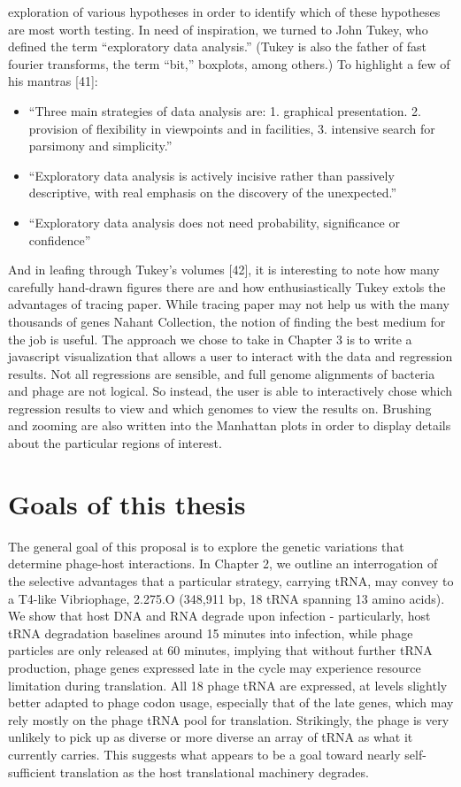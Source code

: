 \documentclass[12pt,twoside]{mitthesis-manusdown}
\begin{document}
exploration of various hypotheses in order to identify which of these
hypotheses are most worth testing. In need of inspiration, we turned to
John Tukey, who defined the term ``exploratory data analysis.'' (Tukey
is also the father of fast fourier transforms, the term ``bit,''
boxplots, among others.) To highlight a few of his mantras {[}41{]}:
\begin{itemize}
\item
  ``Three main strategies of data analysis are: 1. graphical
  presentation. 2. provision of flexibility in viewpoints and in
  facilities, 3. intensive search for parsimony and simplicity.''
\item
  ``Exploratory data analysis is actively incisive rather than passively
  descriptive, with real emphasis on the discovery of the unexpected.''
\item
  ``Exploratory data analysis does not need probability, significance or
  confidence''
\end{itemize}
And in leafing through Tukey's volumes {[}42{]}, it is interesting to
note how many carefully hand-drawn figures there are and how
enthusiastically Tukey extols the advantages of tracing paper. While
tracing paper may not help us with the many thousands of genes Nahant
Collection, the notion of finding the best medium for the job is useful.
The approach we chose to take in Chapter 3 is to write a javascript
visualization that allows a user to interact with the data and
regression results. Not all regressions are sensible, and full genome
alignments of bacteria and phage are not logical. So instead, the user
is able to interactively chose which regression results to view and
which genomes to view the results on. Brushing and zooming are also
written into the Manhattan plots in order to display details about the
particular regions of interest.

\section{Goals of this thesis}\label{goals-of-this-thesis}

The general goal of this proposal is to explore the genetic variations
that determine phage-host interactions. In Chapter 2, we outline an
interrogation of the selective advantages that a particular strategy,
carrying tRNA, may convey to a T4-like Vibriophage, 2.275.O (348,911 bp,
18 tRNA spanning 13 amino acids). We show that host DNA and RNA degrade
upon infection - particularly, host tRNA degradation baselines around 15
minutes into infection, while phage particles are only released at 60
minutes, implying that without further tRNA production, phage genes
expressed late in the cycle may experience resource limitation during
translation. All 18 phage tRNA are expressed, at levels slightly better
adapted to phage codon usage, especially that of the late genes, which
may rely mostly on the phage tRNA pool for translation. Strikingly, the
phage is very unlikely to pick up as diverse or more diverse an array of
tRNA as what it currently carries. This suggests what appears to be a
goal toward nearly self-sufficient translation as the host translational
machinery degrades.
\end{document}
